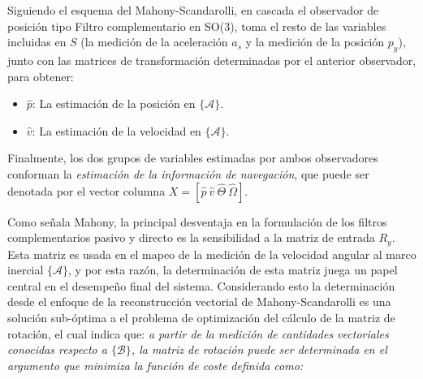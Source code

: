 \documentclass[conference]{IEEEtran}
\newcommand{\marco}[1]{\{\mathcal{#1}\}}
\begin{document}
Siguiendo el esquema del Mahony-Scandarolli, en cascada el observador de posición tipo Filtro complementario en SO(3), toma el resto de las variables incluidas en $S$ (la medición de la aceleración $a_s$ y la medición de la posición $p_y$), junto con las matrices de transformación determinadas por el anterior observador, para obtener:
\begin{itemize}
\item $\hat{p}$: La estimación de la posición en $\marco{A}$.
\item $\hat{v}$: La estimación de la velocidad en $\marco{A}$.
\end{itemize}
Finalmente, los dos grupos de variables estimadas por ambos observadores conforman la \emph{estimación de la información de navegación}, que puede ser denotada por el vector columna $X=[\hat{p}~\hat{v}~\hat{\Theta}~\hat{\Omega}]$.\par
Como señala Mahony, la principal desventaja en la formulación de los filtros complementarios pasivo y directo es la sensibilidad a la matriz de entrada $R_y$. Esta matriz es usada en el mapeo de la medición de la velocidad angular al marco inercial $\marco{A}$, y por esta razón, la determinación de esta matriz juega un papel central en el desempeño final del sistema. Considerando esto la determinación desde el enfoque de la reconstrucción vectorial de Mahony-Scandarolli es una solución sub-óptima a el problema de optimización del cálculo de la matriz de rotación, el cual indica que: \emph{a partir de la medición de cantidades vectoriales conocidas respecto a $\marco{B}$, la matriz de rotación puede ser determinada en el argumento que minimiza la función de coste definida como:}
\end{document}
